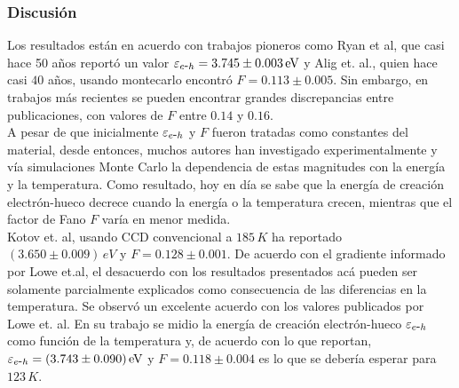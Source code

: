 {\subsubsection{Discusión}
Los resultados están en acuerdo con trabajos pioneros como Ryan et al, que casi hace 50 años reportó un valor $\varepsilon_{\eh} = 3.745 \pm 0.003\,\si{eV}$ y Alig et. al., quien hace casi $40$ años, usando montecarlo encontró $F = 0.113 \pm 0.005$. Sin embargo, en trabajos más recientes se pueden encontrar grandes discrepancias entre publicaciones, con valores de $F$ entre $0.14$ y $0.16$.\\
\indent A pesar de que inicialmente $\varepsilon_{\eh}$ y $F$ fueron tratadas como constantes del material, desde entonces, muchos autores han investigado experimentalmente y vía simulaciones Monte Carlo la dependencia de estas magnitudes con la energía y la temperatura. Como resultado, hoy en día se sabe que la energía de creación electrón-hueco decrece cuando la energía o la temperatura crecen, mientras que el factor de Fano $F$ varía en menor medida.\\
\indent Kotov et. al, usando CCD convencional a $185\,\si{K}$ ha reportado $(3.650 \pm 0.009)\,\si{eV}$ y $F = 0.128 \pm 0.001$. De acuerdo con el gradiente informado por Lowe et.al, el desacuerdo con los resultados presentados acá pueden ser solamente parcialmente explicados como consecuencia de las diferencias en la temperatura. Se observó un excelente acuerdo con los valores publicados por Lowe et. al. En su trabajo se midio la energía de creación electrón-hueco $\varepsilon_{\eh}$ como función de la temperatura y, de acuerdo con lo que reportan, $\varepsilon_{\eh} = (3.743 \pm 0.090)\,\si{eV}$ y $F = 0.118 \pm 0.004$ es lo que se debería esperar para $123\,\si{K}$.\\
}

